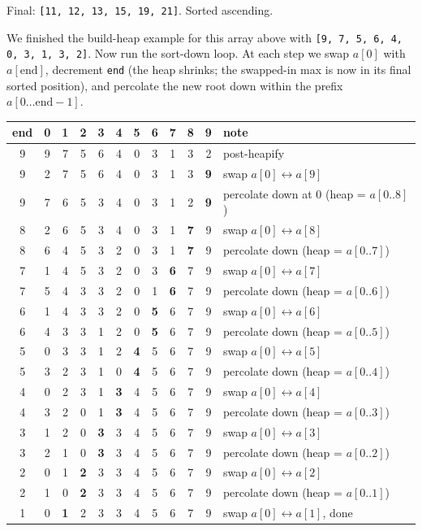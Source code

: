 \documentclass[11pt]{article}
\begin{document}
Final: \texttt{[11, 12, 13, 15, 19, 21]}. Sorted ascending.

\begin{examplebox}
We finished the build-heap example for this array above with
\texttt{[9, 7, 5, 6, 4, 0, 3, 1, 3, 2]}. Now run the sort-down loop.
At each step we swap $a[0]$ with $a[\text{end}]$, decrement
\texttt{end} (the heap shrinks; the swapped-in max is now in its
final sorted position), and percolate the new root down within the
prefix $a[0 \ldots \text{end}-1]$.

\begin{center}
\renewcommand{\arraystretch}{1.05}
\begin{tabular}{|c|cccccccccc|l|}
\hline
end & 0 & 1 & 2 & 3 & 4 & 5 & 6 & 7 & 8 & 9 & note \\
\hline
9 & 9 & 7 & 5 & 6 & 4 & 0 & 3 & 1 & 3 & 2 & post-heapify \\
9 & 2 & 7 & 5 & 6 & 4 & 0 & 3 & 1 & 3 & \textbf{9} & swap $a[0] \leftrightarrow a[9]$ \\
9 & 7 & 6 & 5 & 3 & 4 & 0 & 3 & 1 & 2 & \textbf{9} & percolate down at 0 (heap = $a[0..8]$) \\
8 & 2 & 6 & 5 & 3 & 4 & 0 & 3 & 1 & \textbf{7} & 9 & swap $a[0] \leftrightarrow a[8]$ \\
8 & 6 & 4 & 5 & 3 & 2 & 0 & 3 & 1 & \textbf{7} & 9 & percolate down (heap = $a[0..7]$) \\
7 & 1 & 4 & 5 & 3 & 2 & 0 & 3 & \textbf{6} & 7 & 9 & swap $a[0] \leftrightarrow a[7]$ \\
7 & 5 & 4 & 3 & 3 & 2 & 0 & 1 & \textbf{6} & 7 & 9 & percolate down (heap = $a[0..6]$) \\
6 & 1 & 4 & 3 & 3 & 2 & 0 & \textbf{5} & 6 & 7 & 9 & swap $a[0] \leftrightarrow a[6]$ \\
6 & 4 & 3 & 3 & 1 & 2 & 0 & \textbf{5} & 6 & 7 & 9 & percolate down (heap = $a[0..5]$) \\
5 & 0 & 3 & 3 & 1 & 2 & \textbf{4} & 5 & 6 & 7 & 9 & swap $a[0] \leftrightarrow a[5]$ \\
5 & 3 & 2 & 3 & 1 & 0 & \textbf{4} & 5 & 6 & 7 & 9 & percolate down (heap = $a[0..4]$) \\
4 & 0 & 2 & 3 & 1 & \textbf{3} & 4 & 5 & 6 & 7 & 9 & swap $a[0] \leftrightarrow a[4]$ \\
4 & 3 & 2 & 0 & 1 & \textbf{3} & 4 & 5 & 6 & 7 & 9 & percolate down (heap = $a[0..3]$) \\
3 & 1 & 2 & 0 & \textbf{3} & 3 & 4 & 5 & 6 & 7 & 9 & swap $a[0] \leftrightarrow a[3]$ \\
3 & 2 & 1 & 0 & \textbf{3} & 3 & 4 & 5 & 6 & 7 & 9 & percolate down (heap = $a[0..2]$) \\
2 & 0 & 1 & \textbf{2} & 3 & 3 & 4 & 5 & 6 & 7 & 9 & swap $a[0] \leftrightarrow a[2]$ \\
2 & 1 & 0 & \textbf{2} & 3 & 3 & 4 & 5 & 6 & 7 & 9 & percolate down (heap = $a[0..1]$) \\
1 & 0 & \textbf{1} & 2 & 3 & 3 & 4 & 5 & 6 & 7 & 9 & swap $a[0] \leftrightarrow a[1]$, done \\
\hline
\end{tabular}
\end{center}


\end{examplebox}
\end{document}
